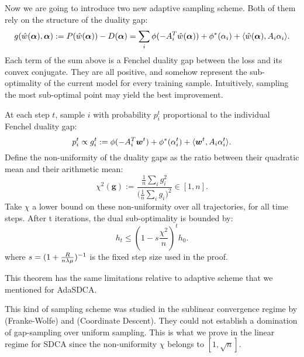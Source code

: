 \begin{subappendices}
	Now we are going to introduce two new adaptive sampling scheme.
	Both of them rely on the structure of the duality gap:
	\begin{equation}
		g(\hat w(\boldsymbol{\alpha}),\boldsymbol{\alpha}) := P(\hat w(\boldsymbol{\alpha})) - D(\boldsymbol{\alpha}) = \sum_i \phi(-A_i^T \hat w(\boldsymbol{\alpha})) + \phi^*(\alpha_i) + \langle \hat w(\boldsymbol{\alpha}),  A_i \alpha_i \rangle.
	\end{equation}
	Each term of the sum above is a Fenchel duality gap between the loss and its convex conjugate.
	They are all positive, and somehow represent the sub-optimality of the current model for every training sample.
	Intuitively, sampling the most sub-optimal point may yield the best improvement.

	\begin{theorem}
		\label{app:th:gap}
		At each step $t$, sample $i$ with probability $p_i^t$ proportional to the individual Fenchel duality gap:
		\begin{equation}
			p_i^t \propto g_i^t := \phi(-A_i^T \boldsymbol{w}^t) + \phi^*(\alpha_i^t) + \langle \boldsymbol{w}^t,  A_i \alpha_i^t \rangle.
		\end{equation}
		Define the non-uniformity of the duality gaps as the ratio between their quadratic mean and their arithmetic mean:
		\begin{equation}
			\label{app:eq:non-uniformity}
			\chi^2(\bm g) := \frac{\frac{1}{n} \sum_i g_i^2}{  \big ( \frac{1}{n}  \sum_i g_i \big )^2 } \in [1,n].
		\end{equation}
		Take $\chi$ a lower bound on these non-uniformity over all trajectories, for all time steps.
		After t iterations, the dual sub-optimality is bounded by:
		\begin{equation}
			h_t \leq (1-s\frac{\chi^2}{n})^t  h_0.
		\end{equation}
		where $ s = (1+ \frac{R}{n \lambda \mu} )^{-1} $ is the fixed step size used in the proof.
	\end{theorem}

	This theorem has the same limitations relative to adaptive scheme that we mentioned for AdaSDCA.

	This kind of sampling scheme was studied in the sublinear convergence regime by \citet{osokin2016minding} (Franke-Wolfe) and \citet{perekrestenko17a} (Coordinate Descent).
	They could not establish a domination of gap-sampling over uniform sampling.
	This is what we prove in the linear regime for SDCA since the non-uniformity $\chi$ belongs to $[1,\sqrt n]$.


\end{subappendices}
